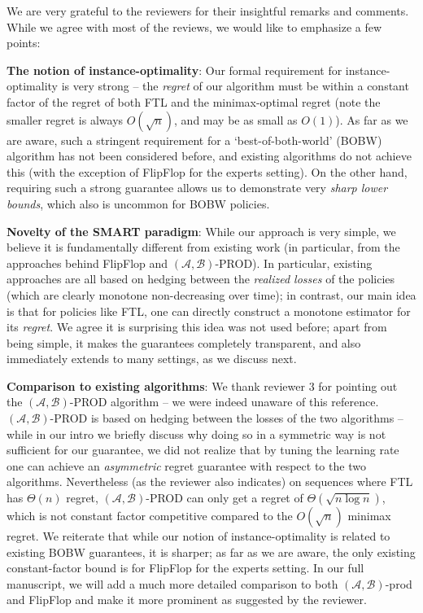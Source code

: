 \documentclass[12pt]{colt2024} %
\begin{document}
      \title{}    
      We are very grateful to the reviewers for their insightful remarks and comments. While we agree with most of the reviews, we would like to emphasize a few points: 
      \medskip
      
      \noindent\textbf{The notion of instance-optimality}: Our formal requirement for instance-optimality is very strong -- the \emph{regret} of our algorithm must be within a constant factor of the regret of both FTL and the minimax-optimal regret (note the smaller regret is always $O(\sqrt{n})$, and may be as small as $O(1)$). As far as we are aware, such a stringent requirement for a `best-of-both-world' (BOBW) algorithm has not been considered before, and existing algorithms do not achieve this (with the exception of FlipFlop for the experts setting). On the other hand, requiring such a strong guarantee allows us to demonstrate very \emph{sharp lower bounds}, which also is uncommon for BOBW policies. 
    
      \medskip      
      \noindent\textbf{Novelty of the SMART paradigm}: While our approach is very simple, we believe it is fundamentally different from existing work (in particular, from the approaches behind FlipFlop and $(\mathcal{A},\mathcal{B})$-PROD). In particular, existing approaches are all based on hedging between the \emph{realized losses} of the policies (which are clearly monotone non-decreasing over time); in contrast, our main idea is that for policies like FTL, one can directly construct a monotone estimator for its \emph{regret}. We agree it is surprising this idea was not used before; apart from being simple, it makes the guarantees completely transparent, and also immediately extends to many settings, as we discuss next. 
        
      \medskip
      \noindent\textbf{Comparison to existing algorithms}: We thank reviewer $3$ for pointing out the $(\mathcal{A},\mathcal{B})$-PROD algorithm -- we were indeed unaware of this reference. $(\mathcal{A},\mathcal{B})$-PROD is based on hedging between the losses of the two algorithms -- while in our intro we briefly discuss why doing so in a symmetric way is not sufficient for our guarantee, we did not realize that by tuning the learning rate one can achieve an \emph{asymmetric} regret guarantee with respect to the two algorithms. Nevertheless (as the reviewer also indicates) on sequences where FTL has $\Theta(n)$ regret, $(\mathcal{A},\mathcal{B})$-PROD can only get a regret of $\Theta(\sqrt{n \log n})$, which is not constant factor competitive compared to the $O(\sqrt{n})$ minimax regret. %
     We reiterate that while our notion of instance-optimality is related to existing BOBW guarantees, it is sharper; as far as we are aware, the only existing constant-factor bound is for FlipFlop for the experts setting.
     In our full manuscript, we will add a much more detailed comparison to both $(\mathcal{A},\mathcal{B})$-prod and FlipFlop and make it more prominent as suggested by the reviewer.   
\end{document}
